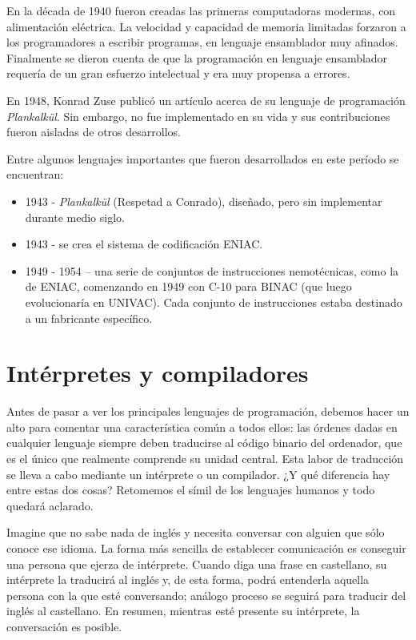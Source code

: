 \documentclass[twoside,twocolumn]{article}
\begin{document}
En la década de 1940 fueron creadas las primeras computadoras modernas, con alimentación eléctrica. La velocidad y capacidad de memoria limitadas forzaron a los programadores a escribir programas, en lenguaje ensamblador muy afinados. Finalmente se dieron cuenta de que la programación en lenguaje ensamblador requería de un gran esfuerzo intelectual y era muy propensa a errores.

En 1948, Konrad Zuse publicó un artículo acerca de su lenguaje de programación \textit{Plankalkül}. Sin embargo, no fue implementado en su vida y sus contribuciones fueron aisladas de otros desarrollos\cite{hist}.

Entre algunos lenguajes importantes que fueron desarrollados en este período se encuentran: 
\begin{itemize}
\item     1943 - \textit{Plankalkül} (Respetad a Conrado), diseñado, pero sin implementar durante medio siglo.
\item   1943 - se crea el sistema de codificación ENIAC.
\item  1949 - 1954 -- una serie de conjuntos de instrucciones nemotécnicas, como la de ENIAC, comenzando en 1949 con C-10 para BINAC (que luego evolucionaría en UNIVAC). Cada conjunto de instrucciones estaba destinado a un fabricante específico.
\end{itemize}





\section{Intérpretes y compiladores}

Antes de pasar a ver los principales lenguajes de
programación, debemos hacer un alto para comentar
una característica común a todos ellos: las órdenes
dadas en cualquier lenguaje siempre deben traducirse
al código binario del ordenador, que es el único que
realmente comprende su unidad central. Esta labor de
traducción se lleva a cabo mediante un intérprete o un
compilador. ¿Y qué diferencia hay entre estas dos
cosas? Retomemos el símil de los lenguajes humanos y
todo quedará aclarado.

Imagine que no sabe nada de inglés y necesita conversar con alguien que sólo conoce ese idioma. La
forma más sencilla de establecer comunicación es conseguir una persona que ejerza de intérprete. Cuando
diga una frase en castellano, su intérprete la traducirá
al inglés y, de esta forma, podrá entenderla aquella
persona con la que esté conversando; análogo proceso
se seguirá para traducir del inglés al castellano. En
resumen, mientras esté presente su intérprete, la conversación es posible.
\end{document}
